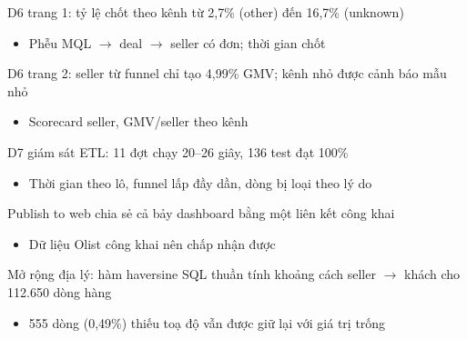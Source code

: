 \begin{frame}{D6 trang 1: tỷ lệ chốt theo kênh từ 2,7\% (other) đến 16,7\% (unknown)}
\begin{itemize}
  \item Phễu MQL $\rightarrow$ deal $\rightarrow$ seller có đơn; thời gian chốt
\end{itemize}

\end{frame}

\begin{frame}{D6 trang 2: seller từ funnel chỉ tạo 4,99\% GMV; kênh nhỏ được cảnh báo mẫu nhỏ}
\begin{itemize}
  \item Scorecard seller, GMV/seller theo kênh
\end{itemize}

\end{frame}

\begin{frame}{D7 giám sát ETL: 11 đợt chạy 20–26 giây, 136 test đạt 100\%}
\begin{itemize}
  \item Thời gian theo lô, funnel lấp đầy dần, dòng bị loại theo lý do
\end{itemize}

\end{frame}

\begin{frame}{Publish to web chia sẻ cả bảy dashboard bằng một liên kết công khai}
\begin{itemize}
  \item Dữ liệu Olist công khai nên chấp nhận được
\end{itemize}

\end{frame}

\begin{frame}{Mở rộng địa lý: hàm haversine SQL thuần tính khoảng cách seller $\rightarrow$ khách cho 112.650 dòng hàng}
\begin{itemize}
  \item 555 dòng (0,49\%) thiếu toạ độ vẫn được giữ lại với giá trị trống
\end{itemize}

\end{frame}

